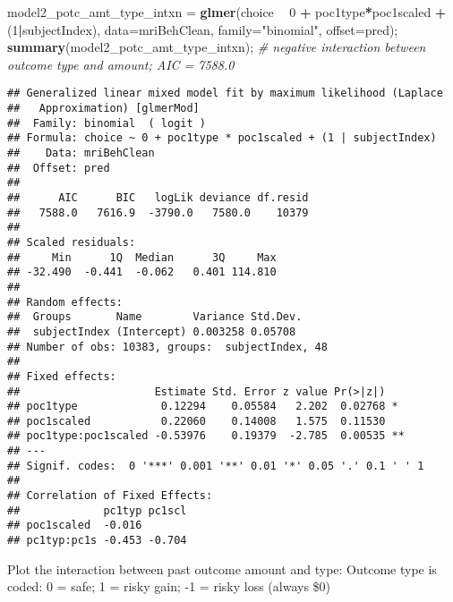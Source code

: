 \documentclass[]{article}
\newenvironment{Shaded}{\begin{snugshade}}{\end{snugshade}}
\newcommand{\CommentTok}[1]{\textcolor[rgb]{0.56,0.35,0.01}{\textit{#1}}}
\newcommand{\DataTypeTok}[1]{\textcolor[rgb]{0.13,0.29,0.53}{#1}}
\newcommand{\DecValTok}[1]{\textcolor[rgb]{0.00,0.00,0.81}{#1}}
\newcommand{\KeywordTok}[1]{\textcolor[rgb]{0.13,0.29,0.53}{\textbf{#1}}}
\newcommand{\NormalTok}[1]{#1}
\newcommand{\OperatorTok}[1]{\textcolor[rgb]{0.81,0.36,0.00}{\textbf{#1}}}
\newcommand{\StringTok}[1]{\textcolor[rgb]{0.31,0.60,0.02}{#1}}
\begin{document}
\begin{Shaded}
\begin{Highlighting}[]
\NormalTok{model2_potc_amt_type_intxn =}\StringTok{ }\KeywordTok{glmer}\NormalTok{(choice }\OperatorTok{~}\StringTok{ }\DecValTok{0} \OperatorTok{+}\StringTok{ }\NormalTok{poc1type}\OperatorTok{*}\NormalTok{poc1scaled }\OperatorTok{+}\StringTok{ }\NormalTok{(}\DecValTok{1}\OperatorTok{|}\NormalTok{subjectIndex), }\DataTypeTok{data=}\NormalTok{mriBehClean, }\DataTypeTok{family=}\StringTok{"binomial"}\NormalTok{, }\DataTypeTok{offset=}\NormalTok{pred);}
\KeywordTok{summary}\NormalTok{(model2_potc_amt_type_intxn); }\CommentTok{# negative interaction between outcome type and amount; AIC = 7588.0}
\end{Highlighting}
\end{Shaded}

\begin{verbatim}
## Generalized linear mixed model fit by maximum likelihood (Laplace
##   Approximation) [glmerMod]
##  Family: binomial  ( logit )
## Formula: choice ~ 0 + poc1type * poc1scaled + (1 | subjectIndex)
##    Data: mriBehClean
##  Offset: pred
## 
##      AIC      BIC   logLik deviance df.resid 
##   7588.0   7616.9  -3790.0   7580.0    10379 
## 
## Scaled residuals: 
##     Min      1Q  Median      3Q     Max 
## -32.490  -0.441  -0.062   0.401 114.810 
## 
## Random effects:
##  Groups       Name        Variance Std.Dev.
##  subjectIndex (Intercept) 0.003258 0.05708 
## Number of obs: 10383, groups:  subjectIndex, 48
## 
## Fixed effects:
##                     Estimate Std. Error z value Pr(>|z|)   
## poc1type             0.12294    0.05584   2.202  0.02768 * 
## poc1scaled           0.22060    0.14008   1.575  0.11530   
## poc1type:poc1scaled -0.53976    0.19379  -2.785  0.00535 **
## ---
## Signif. codes:  0 '***' 0.001 '**' 0.01 '*' 0.05 '.' 0.1 ' ' 1
## 
## Correlation of Fixed Effects:
##             pc1typ pc1scl
## poc1scaled  -0.016       
## pc1typ:pc1s -0.453 -0.704
\end{verbatim}

Plot the interaction between past outcome amount and type: Outcome type
is coded: 0 = safe; 1 = risky gain; -1 = risky loss (always \$0)
\end{document}
